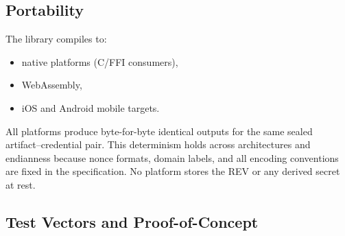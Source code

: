 \documentclass[12pt,a4paper]{article}
\begin{document}
  \subsection{Portability}

  The library compiles to:

  \begin{itemize}
   \item native platforms (C/FFI consumers),
   \item WebAssembly,
   \item iOS and Android mobile targets.
  \end{itemize}

  All platforms produce byte-for-byte identical outputs for the same sealed artifact–credential pair. This determinism holds across architectures and
  endianness because nonce formats, domain labels, and all encoding
  conventions are fixed in the specification. No platform stores the REV or
  any derived secret at rest.

\subsection{Test Vectors and Proof-of-Concept}
\end{document}
